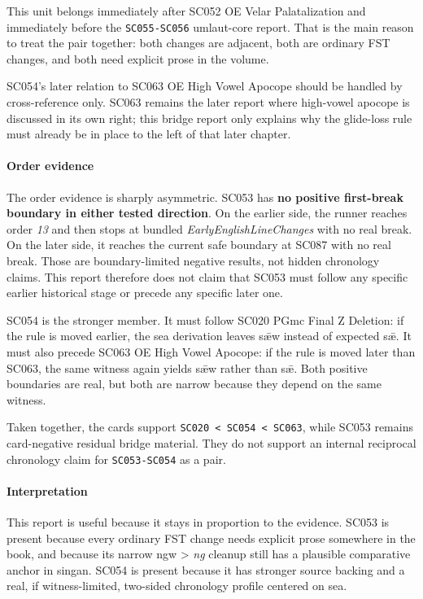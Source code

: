 \documentclass[
  british,
  a4paper,
]{article}
\begin{document}
This unit belongs immediately after SC052 OE Velar Palatalization and
immediately before the \texttt{SC055-SC056} umlaut-core report. That is
the main reason to treat the pair together: both changes are adjacent,
both are ordinary FST changes, and both need explicit prose in the
volume.

SC054's later relation to SC063 OE High Vowel Apocope should be handled
by cross-reference only. SC063 remains the later report where high-vowel
apocope is discussed in its own right; this bridge report only explains
why the glide-loss rule must already be in place to the left of that
later chapter.

\paragraph{Order evidence}\label{order-evidence-33}

The order evidence is sharply asymmetric. SC053 has \textbf{no positive
first-break boundary in either tested direction}. On the earlier side,
the runner reaches order \emph{13} and then stops at bundled
\emph{EarlyEnglishLineChanges} with no real break. On the later side, it
reaches the current safe boundary at SC087 with no real break. Those are
boundary-limited negative results, not hidden chronology claims. This
report therefore does not claim that SC053 must follow any specific
earlier historical stage or precede any specific later one.

SC054 is the stronger member. It must follow SC020 PGmc Final Z
Deletion: if the rule is moved earlier, the sea derivation leaves sǣw
instead of expected sǣ. It must also precede SC063 OE High Vowel
Apocope: if the rule is moved later than SC063, the same witness again
yields sǣw rather than sǣ. Both positive boundaries are real, but both
are narrow because they depend on the same witness.

Taken together, the cards support
\texttt{SC020\ \textless{}\ SC054\ \textless{}\ SC063}, while SC053
remains card-negative residual bridge material. They do not support an
internal reciprocal chronology claim for \texttt{SC053-SC054} as a pair.

\paragraph{Interpretation}\label{interpretation-33}

This report is useful because it stays in proportion to the evidence.
SC053 is present because every ordinary FST change needs explicit prose
somewhere in the book, and because its narrow ngw \textgreater{}
\emph{ng} cleanup still has a plausible comparative anchor in singan.
SC054 is present because it has stronger source backing and a real, if
witness-limited, two-sided chronology profile centered on sea.
\end{document}
